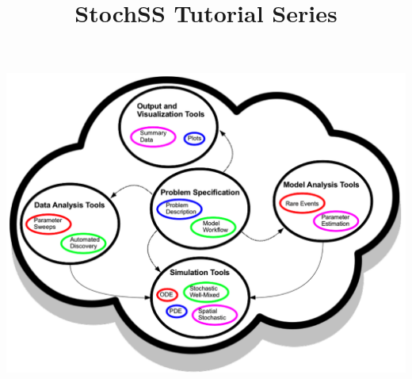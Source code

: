 \begin{titlingpage}
\title{StochSS Tutorial Series}
\includegraphics[width=\textwidth]{cloud-figure.png}
\end{titlingpage}